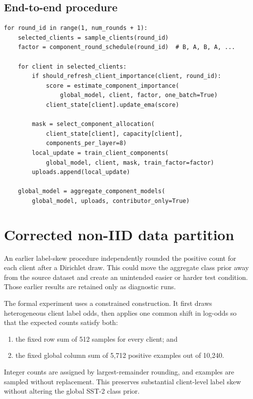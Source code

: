 \documentclass[11pt,a4paper]{article}
\begin{document}
\subsection{End-to-end procedure}

\begin{lstlisting}[caption={High-level PCLA server procedure.},label={lst:pcla}]
for round_id in range(1, num_rounds + 1):
    selected_clients = sample_clients(round_id)
    factor = component_round_schedule(round_id)  # B, A, B, A, ...

    for client in selected_clients:
        if should_refresh_client_importance(client, round_id):
            score = estimate_component_importance(
                global_model, client, factor, one_batch=True)
            client_state[client].update_ema(score)

        mask = select_component_allocation(
            client_state[client], capacity[client],
            components_per_layer=8)
        local_update = train_client_components(
            global_model, client, mask, train_factor=factor)
        uploads.append(local_update)

    global_model = aggregate_component_models(
        global_model, uploads, contributor_only=True)
\end{lstlisting}

\section{Corrected non-IID data partition}

An earlier label-skew procedure independently rounded the positive count for
each client after a Dirichlet draw. This could move the aggregate class prior
away from the source dataset and create an unintended easier or harder test
condition. Those earlier results are retained only as diagnostic runs.

The formal experiment uses a constrained construction. It first draws
heterogeneous client label odds, then applies one common shift in log-odds so
that the expected counts satisfy both:
\begin{enumerate}[leftmargin=1.6em]
  \item the fixed row sum of 512 samples for every client; and
  \item the fixed global column sum of 5,712 positive examples out of 10,240.
\end{enumerate}
Integer counts are assigned by largest-remainder rounding, and examples are
sampled without replacement. This preserves substantial client-level label
skew without altering the global SST-2 class prior.
\end{document}
